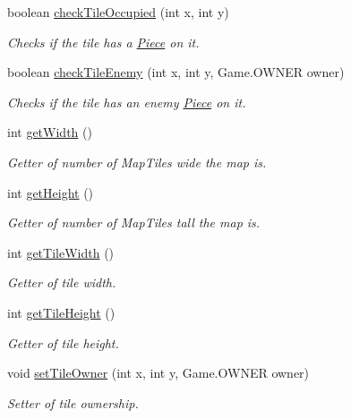 \begin{DoxyCompactItemize}
boolean \hyperlink{classapplication_1_1_map_a4c8ecfb3c342531fcf2e82b9951dacd9}{check\+Tile\+Occupied} (int x, int y)
\begin{DoxyCompactList}\small\item\em Checks if the tile has a \hyperlink{classapplication_1_1_piece}{Piece} on it. \end{DoxyCompactList}\item 
boolean \hyperlink{classapplication_1_1_map_ace2bcd71a180c9abcc48299dbded34f8}{check\+Tile\+Enemy} (int x, int y, Game.\+O\+W\+N\+E\+R owner)
\begin{DoxyCompactList}\small\item\em Checks if the tile has an enemy \hyperlink{classapplication_1_1_piece}{Piece} on it. \end{DoxyCompactList}\item 
int \hyperlink{classapplication_1_1_map_acf9ab16c56c49259ce5435e708db81d3}{get\+Width} ()
\begin{DoxyCompactList}\small\item\em Getter of number of Map\+Tiles wide the map is. \end{DoxyCompactList}\item 
int \hyperlink{classapplication_1_1_map_a937a0d16608ab0f866484f50cf3e2756}{get\+Height} ()
\begin{DoxyCompactList}\small\item\em Getter of number of Map\+Tiles tall the map is. \end{DoxyCompactList}\item 
int \hyperlink{classapplication_1_1_map_a1f0155540d45815c84b1f1fef5c02b78}{get\+Tile\+Width} ()
\begin{DoxyCompactList}\small\item\em Getter of tile width. \end{DoxyCompactList}\item 
int \hyperlink{classapplication_1_1_map_aed96fe881a45be9f60937b28228e5690}{get\+Tile\+Height} ()
\begin{DoxyCompactList}\small\item\em Getter of tile height. \end{DoxyCompactList}\item 
void \hyperlink{classapplication_1_1_map_abc7ffbed0a366b2e703b1ea3757d0d6a}{set\+Tile\+Owner} (int x, int y, Game.\+O\+W\+N\+E\+R owner)
\begin{DoxyCompactList}\small\item\em Setter of tile ownership. \end{DoxyCompactList}\end{DoxyCompactItemize}


